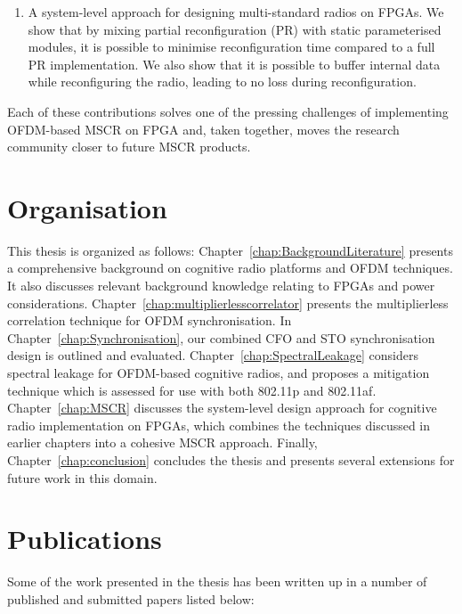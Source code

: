 \begin{enumerate}
\item A system-level approach for designing multi-standard radios on FPGAs.
We show that by mixing partial reconfiguration (PR) with static parameterised modules, it is possible to minimise reconfiguration time compared to a full PR implementation.
We also show that it is possible to buffer internal data while reconfiguring the radio, leading to no loss during reconfiguration.%
\end{enumerate}

Each of these contributions solves one of the pressing challenges of implementing OFDM-based MSCR on FPGA and, taken together, moves the research community closer to future MSCR products.

\section{Organisation}

This thesis is organized as follows:
Chapter~\ref{chap:BackgroundLiterature} presents a comprehensive background on cognitive radio platforms and OFDM techniques. It also discusses relevant background knowledge relating to FPGAs and power considerations. Chapter~\ref{chap:multiplierlesscorrelator} presents the multiplierless correlation technique for OFDM synchronisation. In Chapter~\ref{chap:Synchronisation}, our combined CFO and STO synchronisation design is outlined and evaluated. Chapter~\ref{chap:SpectralLeakage} considers  spectral leakage for OFDM-based cognitive radios, and proposes a mitigation technique which is assessed for use with both 802.11p and 802.11af.
Chapter~\ref{chap:MSCR} discusses the system-level design approach for cognitive radio implementation on FPGAs, which combines the techniques discussed in earlier chapters into a cohesive MSCR approach.
Finally, Chapter~\ref{chap:conclusion} concludes the thesis and presents several extensions for future work in this domain.

\section{Publications}
Some of the work presented in the thesis has been written up in a number of published and submitted papers listed below:

